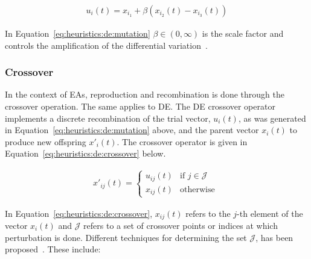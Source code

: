 \begin{equation}
      \label{eq:heuristics:de:mutation}
      \begin{split}
            u_{i}(t) = x_{i_{1}} + \beta(x_{i_{2}}(t) - x_{i_{3}}(t))
      \end{split}
\end{equation}

\noindent
In Equation~\eqref{eq:heuristics:de:mutation} $\beta \in (0, \infty)$ is the scale factor and controls the amplification of the differential variation~\cite{ref:engelbrecht:2007}.


\subsubsection{Crossover}\label{sec:heuristics:mh:de:crossover}

In the context of \acp{EA}, reproduction and recombination is done through the crossover operation. The same applies to \acs{DE}. The \acs{DE} crossover operator implements a discrete recombination of the trial vector, $u_{i}(t)$, as was generated in Equation~\eqref{eq:heuristics:de:mutation} above, and the parent vector $x_{i}(t)$ to produce new offspring $x'_{i}(t)$. The crossover operator is given in Equation~\eqref{eq:heuristics:de:crossover} below.

\begin{equation}
      \label{eq:heuristics:de:crossover}
      \begin{split}
            x'_{ij}(t)=
            \begin{cases}
                  u_{ij}(t) & \text{if } j \in \mathcal{J} \\
                  x_{ij}(t) & \text{otherwise }
            \end{cases}
      \end{split}
\end{equation}

\noindent
In Equation~\eqref{eq:heuristics:de:crossover}, $x_{ij}(t)$ refers to the $j$-th element of the vector $x_{i}(t)$ and $\mathcal{J}$ refers to a set of crossover points or indices at which perturbation is done. Different techniques for determining the set $\mathcal{J}$, has been proposed~\cite{ref:storn:1996, ref:storn:1997}. These include:

